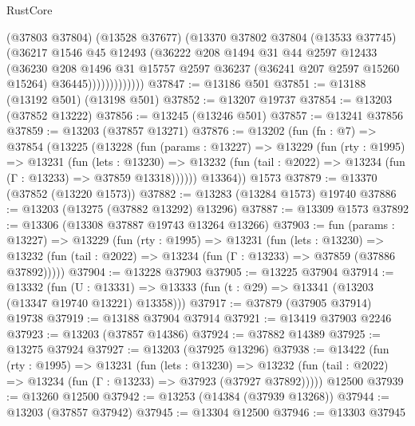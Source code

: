 \begin{lexlean}{RustCore}
\begin{coremodule}
                      (@37803 @37804)
                      (@13528 @37677)
                      (@13370
                        @37802
                        @37804
                        (@13533 @37745)
                        (@36217
                          @1546
                          @45
                          @12493
                          (@36222
                            @208
                            @1494
                            @31
                            @44
                            @2597
                            @12433
                            (@36230
                              @208
                              @1496
                              @31
                              @15757
                              @2597
                              @36237
                              (@36241 @207 @2597 @15260 @15264)
                              @36445)))))))))))))
@37847 := @13186 @501
@37851 := @13188 (@13192 @501) (@13198 @501)
@37852 := @13207 @19737
@37854 := @13203 (@37852 @13222)
@37856 := @13245 (@13246 @501)
@37857 := @13241 @37856
@37859 := @13203 (@37857 @13271)
@37876 := @13202
    (fun (fn : @7) =>
    @37854
      (@13225
        (@13228
          (fun (params : @13227) =>
          @13229
            (fun (rty : @1995) =>
            @13231
              (fun (lets : @13230) =>
              @13232 (fun (tail : @2022) => @13234 (fun (Γ : @13233) => @37859 @13318))))))
        @13364))
    @1573
@37879 := @13370 (@37852 (@13220 @1573))
@37882 := @13283 (@13284 @1573) @19740
@37886 := @13203 (@13275 (@37882 @13292) @13296)
@37887 := @13309 @1573
@37892 := @13306 (@13308 @37887 @19743 @13264 @13266)
@37903 := fun (params : @13227) =>
  @13229
    (fun (rty : @1995) =>
    @13231
      (fun (lets : @13230) =>
      @13232 (fun (tail : @2022) => @13234 (fun (Γ : @13233) => @37859 (@37886 @37892)))))
@37904 := @13228 @37903
@37905 := @13225 @37904
@37914 := @13332
    (fun (U : @13331) => @13333 (fun (t : @29) => @13341 (@13203 (@13347 @19740 @13221) @13358)))
@37917 := @37879 (@37905 @37914) @19738
@37919 := @13188 @37904 @37914
@37921 := @13419 @37903 @2246
@37923 := @13203 (@37857 @14386)
@37924 := @37882 @14389
@37925 := @13275 @37924
@37927 := @13203 (@37925 @13296)
@37938 := @13422
    (fun (rty : @1995) =>
    @13231
      (fun (lets : @13230) =>
      @13232 (fun (tail : @2022) => @13234 (fun (Γ : @13233) => @37923 (@37927 @37892)))))
    @12500
@37939 := @13260 @12500
@37942 := @13253 (@14384 (@37939 @13268))
@37944 := @13203 (@37857 @37942)
@37945 := @13304 @12500
@37946 := @13303 @37945

\end{coremodule}
\end{lexlean}

